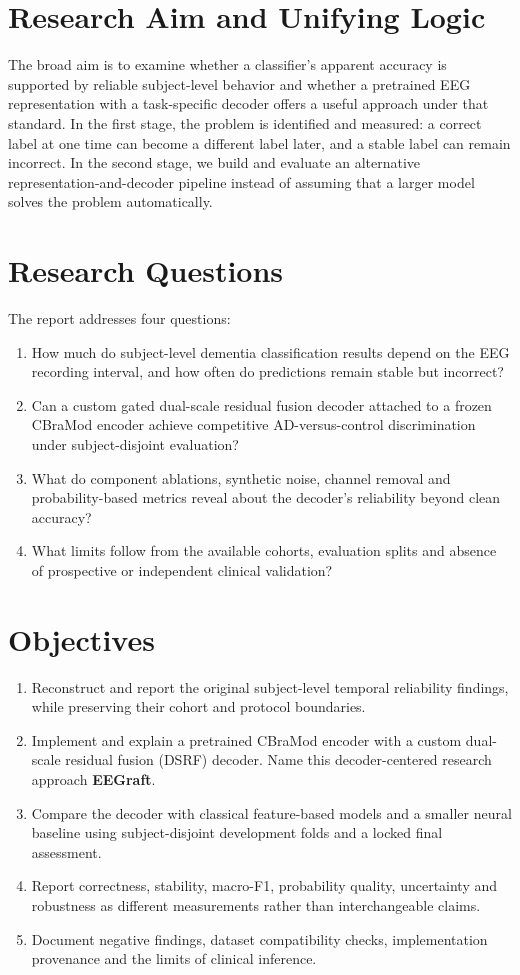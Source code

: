 \section{Research Aim and Unifying Logic}
The broad aim is to examine whether a classifier's apparent accuracy is supported by reliable subject-level behavior and whether a pretrained EEG representation with a task-specific decoder offers a useful approach under that standard. In the first stage, the problem is identified and measured: a correct label at one time can become a different label later, and a stable label can remain incorrect. In the second stage, we build and evaluate an alternative representation-and-decoder pipeline instead of assuming that a larger model solves the problem automatically.

\section{Research Questions}
The report addresses four questions:
\begin{enumerate}[label=\textbf{RQ\arabic*:},leftmargin=2cm]
\item How much do subject-level dementia classification results depend on the EEG recording interval, and how often do predictions remain stable but incorrect?
\item Can a custom gated dual-scale residual fusion decoder attached to a frozen CBraMod encoder achieve competitive AD-versus-control discrimination under subject-disjoint evaluation?
\item What do component ablations, synthetic noise, channel removal and probability-based metrics reveal about the decoder's reliability beyond clean accuracy?
\item What limits follow from the available cohorts, evaluation splits and absence of prospective or independent clinical validation?
\end{enumerate}

\section{Objectives}
\begin{enumerate}
\item Reconstruct and report the original subject-level temporal reliability findings, while preserving their cohort and protocol boundaries.
\item Implement and explain a pretrained CBraMod encoder with a custom dual-scale residual fusion (DSRF) decoder. Name this decoder-centered research approach \textbf{EEGraft}.
\item Compare the decoder with classical feature-based models and a smaller neural baseline using subject-disjoint development folds and a locked final assessment.
\item Report correctness, stability, macro-F1, probability quality, uncertainty and robustness as different measurements rather than interchangeable claims.
\item Document negative findings, dataset compatibility checks, implementation provenance and the limits of clinical inference.
\end{enumerate}

